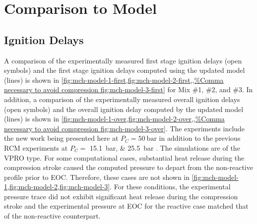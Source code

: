 \documentclass[../main.tex]{subfiles}
\begin{document}
\section{Comparison to Model}
\label{sec:model-comparison}

\subsection{Ignition Delays}

A comparison of the experimentally measured first stage ignition delays (open
symbols) and the first stage ignition delays computed using the updated model
(lines) is shown in \cref{fig:mch-model-1-first,fig:mch-model-2-first,,%
fig:mch-model-3-first} for Mix \#1, \#2, and \#3. In
addition, a comparison of the experimentally measured overall ignition delays
(open symbols) and the overall ignition delay computed by the updated model
(lines) is shown in \cref{fig:mch-model-1-over,fig:mch-model-2-over,,%
fig:mch-model-3-over}. The experiments include the new work being
presented here at $P_C=\SI{50}{\bar}$ in addition to the previous RCM experiments at
$P_C=$ \SIlist{15.1;25.5}{\bar} \cite{Mittal2009}. The simulations are of
the VPRO type. For some computational cases, substantial heat release during
the compression stroke caused the computed pressure to depart from the
non-reactive profile prior to EOC. Therefore, these cases are not shown in
\cref{fig:mch-model-1,fig:mch-model-2,fig:mch-model-3}. For these conditions, the
experimental pressure trace did not exhibit significant heat release during
the compression stroke and the experimental pressure at EOC for the reactive
case matched that of the non-reactive counterpart.
\end{document}
